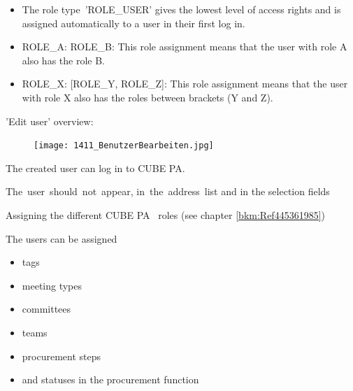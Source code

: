 \begin{itemize}
\item
The role type~'ROLE\_USER' gives the lowest level of access rights and is assigned automatically to a user in their first log in.
\item
ROLE\_A: ROLE\_B: This role assignment means that the user with role A also has the role B.
\item
ROLE\_X: [ROLE\_Y, ROLE\_Z]: This role assignment means that the user with role X also has the roles between brackets (Y and Z).
\end{itemize}

'Edit user' overview:

\vspace{\baselineskip}
\vspace{\baselineskip}

\begin{figure}
\vspace{-55pt}
\texttt{[image: 1411\_BenutzerBearbeiten.jpg]}
\end{figure}

\begin{small}
\begin{raggedright}

The created user can log in to CUBE PA.

\vspace{\baselineskip}

\mbox{The user should not appear,} 
\mbox{in the address list}
and in the selection fields

\vspace{\baselineskip}

Assigning the different CUBE PA \
roles (see chapter \ref{bkm:Ref445361985})

\vspace{\baselineskip}
\vspace{\baselineskip}
\vspace{\baselineskip}

The users can be assigned

\vspace{\baselineskip}

\begin{itemize}
\item tags
\vspace{\baselineskip}
\vspace{\baselineskip}
\item meeting types
\vspace{\baselineskip}
\item committees
\item teams
\item procurement steps
\item and statuses in \newline the procurement function
\end{itemize}

\vspace{\baselineskip}

\end{raggedright}
\end{small}

